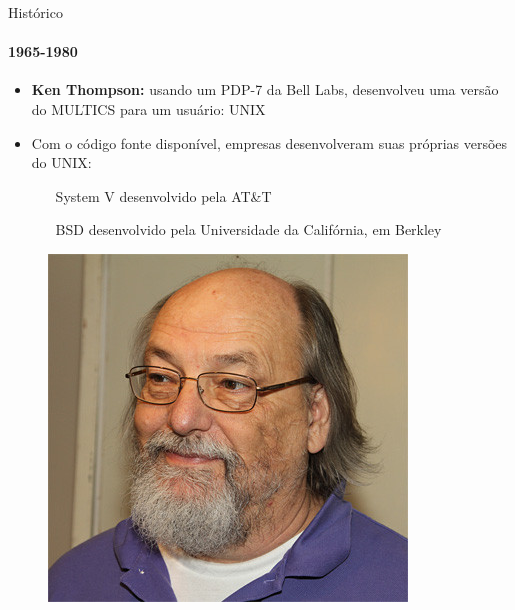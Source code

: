 \documentclass{beamer}
\begin{document}
\begin{frame}{Histórico}
	\framesubtitle{1965-1980}
	\begin{itemize}
		\item \textbf{Ken Thompson:} usando um PDP-7 da Bell Labs, desenvolveu uma versão do MULTICS para um usuário: \alert{UNIX}
		\item Com o código fonte disponível, empresas desenvolveram suas próprias versões do UNIX:
		\begin{itemize}
			\item[System V] desenvolvido pela AT\&T
			\item[BSD] desenvolvido pela Universidade da Califórnia, em Berkley
		\end{itemize}
	\end{itemize}
	\begin{figure}
		\includegraphics[width=0.3\paperwidth]{resources/thompson}
	\end{figure}
\end{frame}
\end{document}

